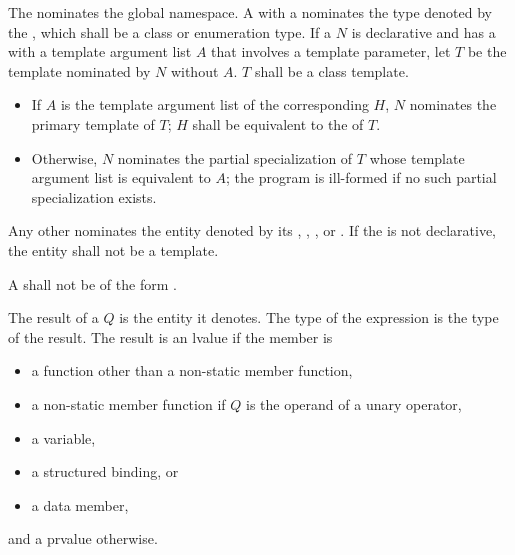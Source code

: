 \documentclass{wg21}
\begin{document}
\pnum
The  \tcode{::} nominates
the global namespace.
A  with a 
nominates the type denoted by the ,
which shall be a class or enumeration type.
If a  $N$
is declarative and
has a  with a template argument list $A$
that involves a template parameter,
let $T$ be the template nominated by $N$ without $A$.
$T$ shall be a class template.
\begin{itemize}
    \item
    If $A$ is the template argument list of
    the corresponding  $H$,
    $N$ nominates the primary template of $T$;
    $H$ shall be equivalent to
    the  of $T$.
    \item
    Otherwise, $N$ nominates the partial specialization of $T$
    whose template argument list is equivalent to $A$;
    the program is ill-formed if no such partial specialization exists.
\end{itemize}
Any other  nominates
the entity denoted by its
,
,
, or
.
If the  is not declarative,
the entity shall not be a template.

\pnum
A  shall not be of the form
  \tcode{\~}
 \tcode{::} \tcode{\~} 
.

\pnum
The result of a  $Q$ is
the entity it denotes.
The type of the expression is the type of the result.
The result is an lvalue if the member is
\begin{itemize}
    \item
    a function other than a non-static member function,
    \item
    a non-static member function
    if $Q$ is the operand of a unary \tcode{\&} operator,
    \item
    a variable,
    \item
    a structured binding, or
    \item
    a data member,
\end{itemize}
and a prvalue otherwise.
\end{document}
